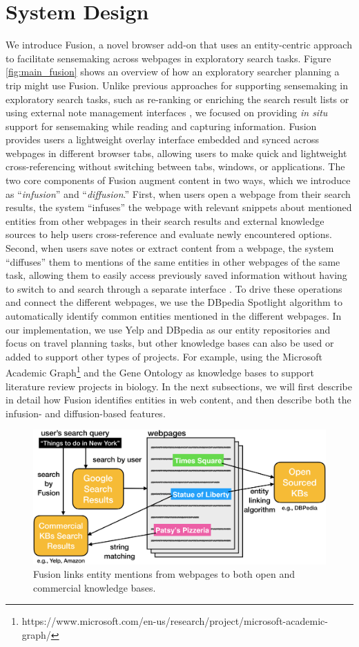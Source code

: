 \section{System Design}
We introduce Fusion, a novel browser add-on that uses an entity-centric approach to facilitate sensemaking across webpages in exploratory search tasks. Figure \ref{fig:main_fusion} shows an overview of how an exploratory searcher planning a trip might use Fusion. Unlike previous approaches for supporting sensemaking in exploratory search tasks, such as re-ranking or enriching the search result lists or using external note management interfaces \cite{syed2017optimizing,miliaraki2015selena}, we focused on providing \emph{in situ} support for sensemaking while reading and capturing information.  Fusion provides users a lightweight overlay interface embedded and synced across webpages in different browser tabs, allowing users to make quick and lightweight cross-referencing without switching between tabs, windows, or applications. The two core components of Fusion augment content in two ways, which we introduce as ``\emph{infusion}'' and ``\emph{diffusion}.'' First, when users open a webpage from their search results, the system ``infuses'' the webpage with relevant snippets about mentioned entities from other webpages in their search results and external knowledge sources to help users cross-reference and evaluate newly encountered options. Second, when users save notes or extract content from a webpage, the system ``diffuses'' them to mentions of the same entities in other webpages of the same task, allowing them to easily access previously saved information without having to switch to and search through a separate interface \cite{notetoself}. To drive these operations and connect the different webpages, we use the DBpedia Spotlight algorithm \cite{spotlight} to automatically identify common entities mentioned in the different webpages. In our implementation, we use Yelp and DBpedia as our entity repositories and focus on travel planning tasks, but other knowledge bases can also be used or added to support other types of projects. For example, using the Microsoft Academic Graph\footnote{https://www.microsoft.com/en-us/research/project/microsoft-academic-graph/} and the Gene Ontology \cite{gene} as knowledge bases to support literature review projects in biology. In the next subsections, we will first describe in detail how Fusion identifies entities in web content, and then describe both the infusion- and diffusion-based features.


\begin{figure}
    \centering
    \includegraphics[width=0.5\columnwidth]{Chapters/Fusion2/entity_linking.png}
    \caption[Linking entities from webpages to open and commercial knowledge bases.]{Fusion links entity mentions from webpages to both open and commercial knowledge bases.}
    \label{fig:entity_linking_fusion}
\end{figure}

